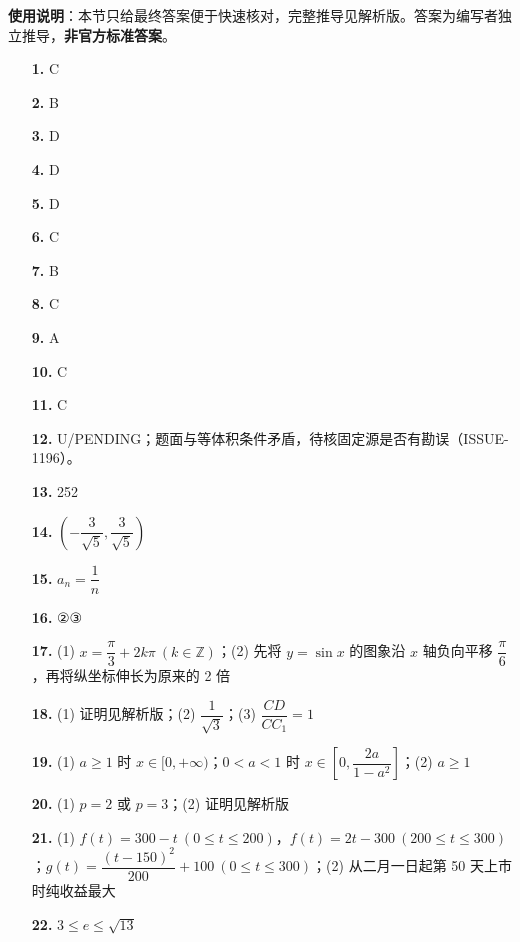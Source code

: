 
\begin{gknotice}
\textbf{使用说明}：本节只给最终答案便于快速核对，完整推导见解析版。答案为编写者独立推导，\textbf{非官方标准答案}。
\end{gknotice}

\begin{itemize}[leftmargin=2.6em]
  \item[\textbf{1.}] C
  \item[\textbf{2.}] B
  \item[\textbf{3.}] D
  \item[\textbf{4.}] D
  \item[\textbf{5.}] D
  \item[\textbf{6.}] C
  \item[\textbf{7.}] B
  \item[\textbf{8.}] C
  \item[\textbf{9.}] A
  \item[\textbf{10.}] C
  \item[\textbf{11.}] C
  \item[\textbf{12.}] U/PENDING；题面与等体积条件矛盾，待核固定源是否有勘误（ISSUE-1196）。
  \item[\textbf{13.}] 252
  \item[\textbf{14.}] $\left(-\dfrac3{\sqrt5},\dfrac3{\sqrt5}\right)$
  \item[\textbf{15.}] $a_n=\dfrac1n$
  \item[\textbf{16.}] ②③
  \item[\textbf{17.}] (1) $x=\dfrac\pi3+2k\pi\ (k\in\mathbb Z)$；(2) 先将 $y=\sin x$ 的图象沿 $x$ 轴负向平移 $\dfrac\pi6$，再将纵坐标伸长为原来的 2 倍
  \item[\textbf{18.}] (1) 证明见解析版；(2) $\dfrac1{\sqrt3}$；(3) $\dfrac{CD}{CC_1}=1$
  \item[\textbf{19.}] (1) $a\ge1$ 时 $x\in[0,+\infty)$；$0<a<1$ 时 $x\in\left[0,\dfrac{2a}{1-a^2}\right]$；(2) $a\ge1$
  \item[\textbf{20.}] (1) $p=2$ 或 $p=3$；(2) 证明见解析版
  \item[\textbf{21.}] (1) $f(t)=300-t\ (0\le t\le200)$，$f(t)=2t-300\ (200\le t\le300)$；$g(t)=\dfrac{(t-150)^2}{200}+100\ (0\le t\le300)$；(2) 从二月一日起第 50 天上市时纯收益最大
  \item[\textbf{22.}] $3\le e\le\sqrt{13}$
\end{itemize}
